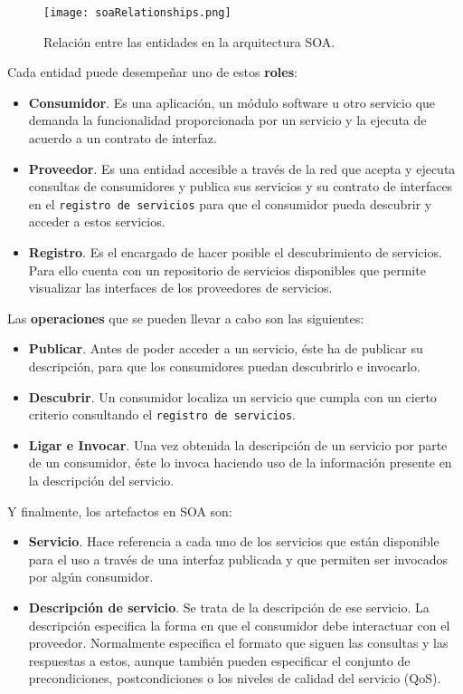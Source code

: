   \begin{figure}[H]
    \begin{center}
      \texttt{[image: soaRelationships.png]}
      \caption{Relación entre las entidades en la arquitectura \acs{SOA}.}
      \label{fig:soaRelationships}
    \end{center}
  \end{figure}

Cada entidad puede desempeñar uno de estos \textbf{roles}:
\begin{itemize}
\item \textbf{Consumidor}. Es una aplicación, un módulo software u otro
servicio que demanda la funcionalidad proporcionada por un servicio y la 
ejecuta de acuerdo a un contrato de interfaz.
\item \textbf{Proveedor}. Es una entidad accesible a través de la red que 
acepta y ejecuta consultas de consumidores y publica sus servicios y su
contrato de interfaces en el \texttt{registro de servicios} para que el 
consumidor pueda descubrir y acceder a estos servicios.
\item \textbf{Registro}. Es el encargado de hacer posible el descubrimiento 
de servicios. Para ello cuenta con un repositorio de servicios disponibles que
permite visualizar las interfaces de los proveedores de servicios.
\end{itemize}

Las \textbf{operaciones} que se pueden llevar a cabo son las siguientes:
\begin{itemize}
\item \textbf{Publicar}. Antes de poder acceder a un servicio, éste ha de
publicar su descripción, para que los consumidores puedan descubrirlo e
invocarlo.
\item \textbf{Descubrir}. Un consumidor localiza un servicio que 
cumpla con un cierto criterio consultando el \texttt{registro de servicios}.
\item \textbf{Ligar e Invocar}. Una vez obtenida la descripción de un servicio 
por parte de un consumidor, éste lo invoca haciendo uso de la información 
presente en la descripción del servicio.
\end{itemize}

Y finalmente, los artefactos en \acs{SOA} son:
\begin{itemize}
\item \textbf{Servicio}. Hace referencia a cada uno de los servicios que están
disponible para el uso a través de una interfaz publicada y que permiten ser
invocados por algún consumidor.
\item \textbf{Descripción de servicio}. Se trata de la descripción de ese
servicio. La descripción especifica la forma en que el consumidor debe
interactuar con el proveedor. Normalmente especifica el formato que siguen
las consultas y las respuestas a estos, aunque también pueden especificar el
conjunto de precondiciones, postcondiciones o los niveles de calidad del
servicio (\acs{QoS}).
\end{itemize}

